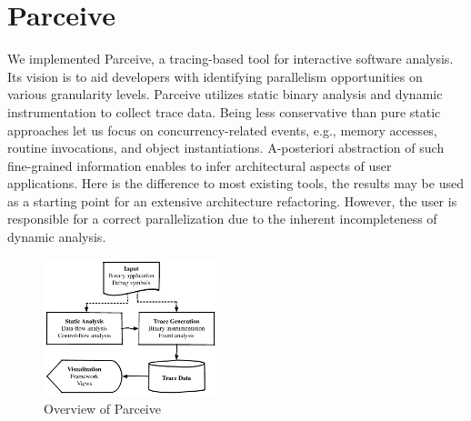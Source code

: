 \documentclass[conference]{IEEEtran}
\begin{document}



\section{Parceive}
\label{sec:parceive}
We implemented Parceive, a tracing-based tool for interactive software
analysis. Its vision is to aid developers with identifying parallelism opportunities
on various granularity levels. Parceive utilizes static binary analysis and dynamic
instrumentation to collect trace data. Being less conservative than pure static
approaches let us focus on concurrency-related events, e.g., memory accesses, routine
invocations, and object instantiations. A-posteriori abstraction of such fine-grained
information enables to infer architectural aspects of user applications. Here is the
difference to most existing tools, the results may be used as a starting point for an
extensive architecture refactoring. However, the user is responsible for a correct
parallelization due to the inherent incompleteness of dynamic analysis.

\begin{figure}
\begin{center}
\includegraphics[width=0.45\textwidth]{img/parceive}
\caption{Overview of Parceive}
\end{center}
\end{figure}
\end{document}
